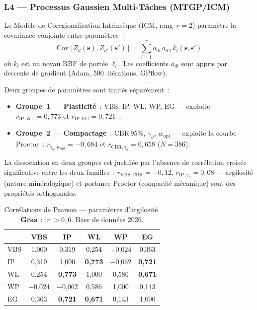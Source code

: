 \documentclass[10pt,a4paper,twocolumn]{article}
\newcommand{\bs}{\mathbf{s}}
\begin{document}
	\subsubsection{L4 --- Processus Gaussien Multi-Tâches (MTGP/ICM)}
	\label{subsec:mtgp}
	
	Le Modèle de Coregionalisation Intrinsèque (ICM, rang~$r=2$)
	\cite{journelhijbregts1978} paramètre la covariance conjointe
	entre paramètres~:
	\begin{equation}
		\mathrm{Cov}[Z_d(\bs),Z_{d'}(\bs')]=
		\sum_{l=1}^{r}a_{dl}\,a_{d'l}\,k_l(\bs,\bs')
		\label{eq:icm}
	\end{equation}
	où $k_l$ est un noyau RBF de portée $\ell_l$.
	Les coefficients $a_{dl}$ sont appris par descente de gradient
	(Adam, 500~itérations, GPflow).
	
	Deux groupes de paramètres sont traités séparément~:
	\begin{itemize}[noitemsep]
		\item \textbf{Groupe~1 --- Plasticité}~:
		VBS, IP, WL, WP, EG --- exploite
		$r_{\mathrm{IP,WL}}=0{,}773$ et $r_{\mathrm{IP,EG}}=0{,}721$~;
		\item \textbf{Groupe~2 --- Compactage}~:
		CBR\,95\%, $\gamma_d$, $w_{\mathrm{opt}}$ --- exploite
		la courbe Proctor~: $r_{\gamma_d,w_{\mathrm{opt}}}=-0{,}684$
		et $r_{\mathrm{CBR},\gamma_d}=0{,}658$ ($N=386$).
	\end{itemize}
	
	La dissociation en deux groupes est justifiée par l'absence de
	corrélation croisée significative entre les deux familles~:
	$r_{\mathrm{VBS,CBR}}=-0{,}12$, $r_{\mathrm{IP},\gamma_d}=0{,}08$
	--- argilosité (nature minéralogique) et portance Proctor
	(compacité mécanique) sont des propriétés orthogonales.
	
	\begin{table}[htbp]
		\centering\small
		\caption{Corrélations de Pearson --- paramètres d'argilosité.
			\textbf{Gras}~: $|r|>0{,}6$. Base de données 2026.}
		\label{tab:correlations}
		\begin{tabular}{lccccc}
			\toprule
			& VBS & IP & WL & WP & EG \\
			\midrule
			VBS & 1,000 & 0,319 & 0,254 & $-$0,024 & 0,363 \\
			IP  & 0,319 & 1,000 & \textbf{0,773} & $-$0,062 & \textbf{0,721} \\
			WL  & 0,254 & \textbf{0,773} & 1,000 & 0,586 & \textbf{0,671} \\
			WP  & $-$0,024 & $-$0,062 & 0,586 & 1,000 & 0,143 \\
			EG  & 0,363 & \textbf{0,721} & \textbf{0,671} & 0,143 & 1,000 \\
			\bottomrule
		\end{tabular}
	\end{table}
	
\end{document}
